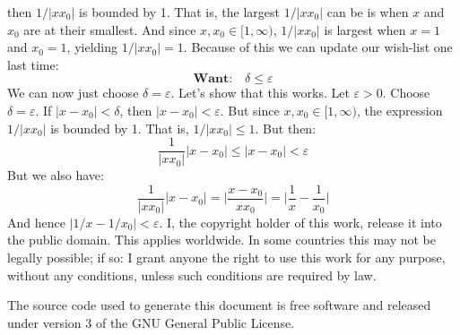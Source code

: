 \documentclass{article}
\theoremstyle{normal}
\begin{document}
    then $1/|xx_{0}|$ is bounded by 1. That is, the largest $1/|xx_{0}|$ can
    be is when $x$ and $x_{0}$ are at their smallest. And since
    $x,x_{0}\in[1,\infty)$, $1/|xx_{0}|$ is largest when $x=1$ and $x_{0}=1$,
    yielding $1/|xx_{0}|=1$. Because of this we can update our wish-list one
    last time:
    \begin{equation}
        \textbf{Want:}\quad
        \delta\leq\varepsilon
    \end{equation}
    We can now just choose $\delta=\varepsilon$. Let's show that this works.
    Let $\varepsilon>0$. Choose $\delta=\varepsilon$. If $|x-x_{0}|<\delta$,
    then $|x-x_{0}|<\varepsilon$. But since $x,x_{0}\in[1,\infty)$, the
    expression $1/|xx_{0}|$ is bounded by 1. That is,
    $1/|xx_{0}|\leq{1}$. But then:
    \begin{equation}
        \frac{1}{|xx_{0}|}|x-x_{0}|\leq|x-x_{0}|<\varepsilon
    \end{equation}
    But we also have:
    \begin{equation}
        \frac{1}{|xx_{0}|}|x-x_{0}|
            =\big|\frac{x-x_{0}}{xx_{0}}\big|
            =\big|\frac{1}{x}-\frac{1}{x_{0}}\big|
    \end{equation}
    And hence $|1/x-1/x_{0}|<\varepsilon$.
    \newpage
    I, the copyright holder of this work, release it into the public domain.
    This applies worldwide. In some countries this may not be legally possible;
    if so: I grant anyone the right to use this work for any purpose, without
    any conditions, unless such conditions are required by law.
    \par\hfill\par
    The source code used to generate this document is free software and released
    under version 3 of the GNU General Public License.
\end{document}
